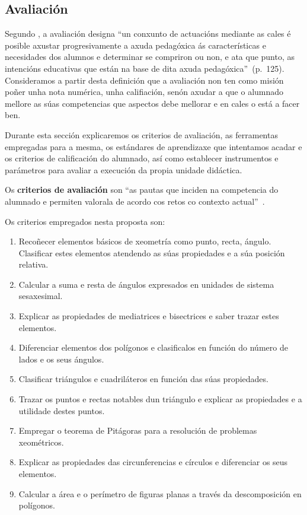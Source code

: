 \subsection{Avaliación}\label{sec:avaliacion}

Segundo , a avaliación designa ``un conxunto de actuacións mediante as cales é posible axustar progresivamente a axuda pedagóxica ás características e necesidades dos alumnos e determinar se compriron ou non, e ata que punto, as intencións educativas que están na base de dita axuda pedagóxica''~(p.~125). Consideramos a partir desta definición que a avaliación non ten como misión poñer unha nota numérica, unha califiación, senón axudar a que o alumnado mellore as súas competencias que aspectos debe mellorar e en cales o está a facer ben.

Durante esta sección explicaremos  os criterios de avaliación, as ferramentas empregadas para a mesma, os estándares de aprendizaxe que intentamos acadar e os criterios de calificación do alumnado, así como establecer instrumentos e parámetros para avaliar a execución da propia unidade didáctica.

Os \textbf{criterios de avaliación} son ``as pautas que inciden na competencia do alumnado e permiten valorala de acordo cos retos co contexto actual''~\cite[p. 134]{secdidac}. %

Os criterios empregados nesta proposta son:

\begin{enumerate}[label=\bfseries Cri\arabic*]
  \item\label{cri1} Recoñecer elementos básicos de xeometría como punto, recta, ángulo. Clasificar estes elementos atendendo as súas propiedades e a súa posición relativa.
  \item\label{cri2} Calcular a suma e resta de ángulos expresados en unidades de sistema sesaxesimal.
  \item\label{cri3} Explicar as propiedades de mediatrices e bisectrices e saber trazar estes elementos.
  \item\label{cri4} Diferenciar elementos dos polígonos e clasificalos en función do número de lados e os seus ángulos.
  \item\label{cri5} Clasificar triángulos e cuadriláteros en función das súas propiedades.
  \item\label{cri6} Trazar os puntos e rectas notables dun triángulo e explicar as propiedades e a utilidade destes puntos.
  \item\label{cri7} Empregar o teorema de Pitágoras para a resolución de problemas xeométricos.
  \item\label{cri8} Explicar as propiedades das circunferencias e círculos e diferenciar os seus elementos.
  \item\label{cri9} Calcular a área e o perímetro de figuras planas a través da descomposición en polígonos.
\end{enumerate}

